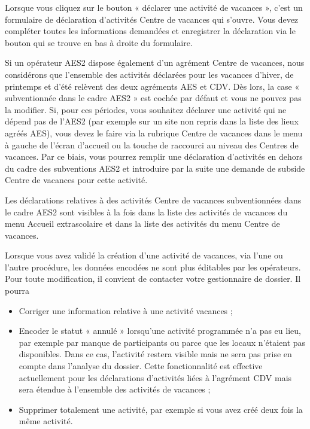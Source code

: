 Lorsque vous cliquez sur le bouton « déclarer une activité de vacances », c’est un formulaire de déclaration d’activités Centre de vacances qui s’ouvre. Vous devez compléter toutes les informations demandées et enregistrer la déclaration via le bouton qui se trouve en bas à droite du formulaire.

\begin{remarque}
Si un opérateur AES2 dispose également d’un agrément Centre de vacances, nous considérons que l’ensemble des activités déclarées pour les vacances d’hiver, de printemps et d’été relèvent des deux agréments AES et CDV. Dès lors, la case « subventionnée dans le cadre AES2 » est cochée par défaut et vous ne pouvez pas la modifier. 
Si, pour ces périodes, vous souhaitez déclarer une activité qui ne dépend pas de l’AES2 (par exemple sur un site non repris dans la liste des lieux agréés AES), vous devez le faire via la rubrique Centre de vacances dans le menu à gauche de l’écran d’accueil ou la touche de raccourci au niveau des Centres de vacances. Par ce biais, vous pourrez remplir une déclaration d’activités en dehors du cadre des subventions AES2 et introduire par la suite une demande de subside Centre de vacances pour cette activité.
\end{remarque}

Les déclarations relatives à des activités Centre de vacances subventionnées dans le cadre AES2 sont visibles à la fois dans la liste des activités de vacances du menu Accueil extrascolaire et dans la liste des activités du menu Centre de vacances.

Lorsque vous avez validé la création d’une activité de vacances, via l’une ou l’autre procédure, les données encodées ne sont plus éditables par les opérateurs. Pour toute modification, il convient de contacter votre gestionnaire de dossier. Il pourra

\begin{itemize}
    \item Corriger une information relative à une activité vacances ;
    \item Encoder le statut « annulé » lorsqu’une activité programmée n’a pas eu lieu, par exemple par manque de participants ou parce que les locaux n’étaient pas disponibles. Dans ce cas, l’activité restera visible mais ne sera pas prise en compte dans l’analyse du dossier. Cette fonctionnalité est effective actuellement pour les déclarations d’activités liées à l’agrément CDV mais sera étendue à l’ensemble des activités de vacances ;
    \item Supprimer totalement une activité, par exemple si vous avez créé deux fois la même activité. 
\end{itemize}

